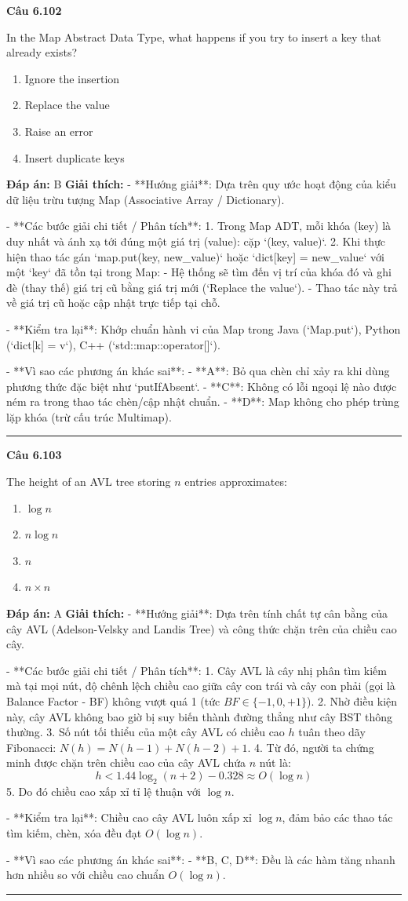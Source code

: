 \documentclass[11pt,a4paper]{article}
\newenvironment{question}[1]{%
  \par\vspace{1em}\noindent\textbf{\large Câu #1}\par\vspace{0.4em}
}{%
  \par\vspace{1em}\hrule\vspace{0.6em}
}
\newenvironment{choices}{%
  \begin{enumerate}[label=\textbf{\Alph*.},leftmargin=2.2em,itemsep=2pt,topsep=3pt]
}{%
  \end{enumerate}
}
\newcommand{\choice}{\item}
\begin{document}
\begin{question}{6.102}
In the Map Abstract Data Type, what happens if you try to insert a key that already exists?
\begin{choices}
\choice Ignore the insertion
\choice Replace the value
\choice Raise an error
\choice Insert duplicate keys
\end{choices}
\textbf{Đáp án:} B
\textbf{Giải thích:} - **Hướng giải**:
  Dựa trên quy ước hoạt động của kiểu dữ liệu trừu tượng Map (Associative Array / Dictionary).

- **Các bước giải chi tiết / Phân tích**:
  1. Trong Map ADT, mỗi khóa (key) là duy nhất và ánh xạ tới đúng một giá trị (value): cặp `(key, value)`.
  2. Khi thực hiện thao tác gán `map.put(key, new_value)` hoặc `dict[key] = new_value` với một `key` đã tồn tại trong Map:
     - Hệ thống sẽ tìm đến vị trí của khóa đó và ghi đè (thay thế) giá trị cũ bằng giá trị mới (`Replace the value`).
     - Thao tác này trả về giá trị cũ hoặc cập nhật trực tiếp tại chỗ.

- **Kiểm tra lại**:
  Khớp chuẩn hành vi của Map trong Java (`Map.put`), Python (`dict[k] = v`), C++ (`std::map::operator[]`).

- **Vì sao các phương án khác sai**:
  - **A**: Bỏ qua chèn chỉ xảy ra khi dùng phương thức đặc biệt như `putIfAbsent`.
  - **C**: Không có lỗi ngoại lệ nào được ném ra trong thao tác chèn/cập nhật chuẩn.
  - **D**: Map không cho phép trùng lặp khóa (trừ cấu trúc Multimap).
\end{question}

\begin{question}{6.103}
The height of an AVL tree storing \(n\) entries approximates:
\begin{choices}
\choice \(\log n\)
\choice \(n \log n\)
\choice \(n\)
\choice \(n \times n\)
\end{choices}
\textbf{Đáp án:} A
\textbf{Giải thích:} - **Hướng giải**:
  Dựa trên tính chất tự cân bằng của cây AVL (Adelson-Velsky and Landis Tree) và công thức chặn trên của chiều cao cây.

- **Các bước giải chi tiết / Phân tích**:
  1. Cây AVL là cây nhị phân tìm kiếm mà tại mọi nút, độ chênh lệch chiều cao giữa cây con trái và cây con phải (gọi là Balance Factor - BF) không vượt quá 1 (tức \(BF \in \{-1, 0, +1\}\)).
  2. Nhờ điều kiện này, cây AVL không bao giờ bị suy biến thành đường thẳng như cây BST thông thường.
  3. Số nút tối thiểu của một cây AVL có chiều cao \(h\) tuân theo dãy Fibonacci: \(N(h) = N(h-1) + N(h-2) + 1\).
  4. Từ đó, người ta chứng minh được chặn trên chiều cao của cây AVL chứa \(n\) nút là:
     \[
     h < 1.44 \log_2(n + 2) - 0.328 \approx O(\log n)
     \]
  5. Do đó chiều cao xấp xỉ tỉ lệ thuận với \(\log n\).

- **Kiểm tra lại**:
  Chiều cao cây AVL luôn xấp xỉ \(\log n\), đảm bảo các thao tác tìm kiếm, chèn, xóa đều đạt \(O(\log n)\).

- **Vì sao các phương án khác sai**:
  - **B, C, D**: Đều là các hàm tăng nhanh hơn nhiều so với chiều cao chuẩn \(O(\log n)\).
\end{question}
\end{document}
